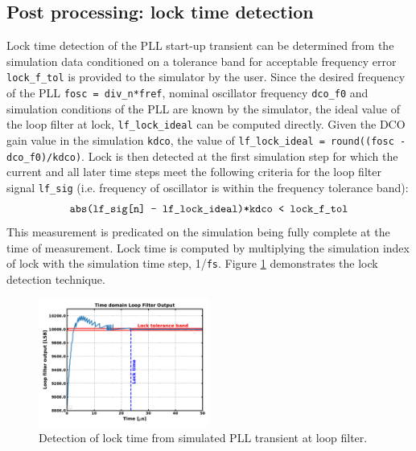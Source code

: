 \subsection{Post processing: lock time detection}
Lock time detection of the PLL start-up transient can be determined from the simulation data conditioned on a tolerance band for acceptable frequency error \texttt{lock\_f\_tol} is provided to the simulator by the user. Since the desired frequency of the PLL \texttt{fosc = div\_n*fref}, nominal oscillator frequency \texttt{dco\_f0} and simulation conditions of the PLL are known by the simulator, the ideal value of the loop filter at lock, \texttt{lf\_lock\_ideal} can be computed directly. Given the DCO gain value in the simulation \texttt{kdco}, the value of \texttt{lf\_lock\_ideal = round((fosc - dco\_f0)/kdco)}. Lock is then detected at the first simulation step for which the current and all later time steps meet the following criteria for the loop filter signal \texttt{lf\_sig} (i.e. frequency of oscillator is within the frequency tolerance band):
\begin{equation}
\text{\texttt{abs(lf\_sig[n] - lf\_lock\_ideal)*kdco < lock\_f\_tol}}
\end{equation}
This measurement is predicated on the simulation being fully complete at the time of measurement. Lock time is computed by multiplying the simulation index of lock with the simulation time step, 1/\texttt{fs}. Figure \ref{fig:loop_filter_trans} demonstrates the lock detection technique.

\begin{figure}[htb!]
	\center\includegraphics[width=0.5\textwidth, angle=0]{figs/loop_filter_trans.pdf}
	\caption{Detection of lock time from simulated PLL transient at loop filter.}
	\label{fig:loop_filter_trans}
\end{figure}
\FloatBarrier

